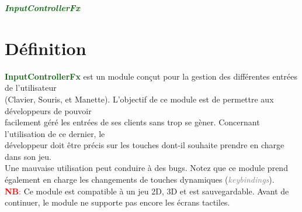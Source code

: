 \documentclass[a4paper, 11pt]{article}
\begin{document}
	\pagecolor{silver}
	\huge{\hspace{12.5cm}\textit{\textbf{\textcolor{darkgreen}{InputControllerFx}}}}\large{}
	\tableofcontents \newpage
	\section{Définition}
	\textcolor{darkgreen}{\textbf{InputControllerFx}} est un module conçut pour la gestion des différentes 
	entrées de l'utilisateur \\(Clavier, Souris, et Manette). L'objectif de ce module est de permettre aux
	développeurs de pouvoir \\facilement géré les entrées de ses clients sans trop se gèner. Concernant 
	l'utilisation de ce dernier, le \\développeur doit être précis sur les touches dont-il souhaite prendre 
	en charge dans son jeu. \\Une mauvaise utilisation peut conduire à des bugs. Notez que ce module prend 
	également en charge les changements de touches dynamiques (\textit{\textcolor{gray}{keybindings}}).\\
	\textcolor{red}{\textbf{NB}:} Ce module est compatible à un jeu 2D, 3D et est sauvegardable. Avant de 
	continuer, le module ne supporte pas encore les écrans tactiles.

\end{document}
